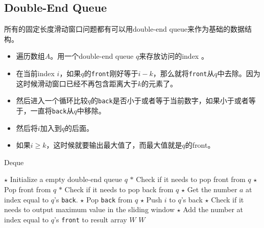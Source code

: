 \subsection{Double-End Queue}
\begin{CJK*}{UTF8}{gbsn}
所有的固定长度滑动窗口问题都有可以用double-end queue来作为基础的数据结构。
\begin{itemize}
\item 遍历数组$A$。用一个double-end queue $q$来存放访问的index
。
\item 在当前index $i$，如果$q$的\texttt{front}刚好等于$i-k$，那么就将\texttt{front}从$q$中去除。因为这时候滑动窗口已经不再包含距离大于$k$的元素了。
\item 然后进入一个循环比较$q$的\texttt{back}是否小于或者等于当前数字，如果小于或者等于，一直将\texttt{back}从$q$中移除。
\item 然后将$i$加入到$q$的后面。
\item 如果$i\geq k$，这时候就要输出最大值了，而最大值就是$q$的front。
\end{itemize}
\end{CJK*}
\setcounter{algorithm}{0}
\begin{algorithm}[H]
\caption{Deque}
\begin{algorithmic}[1]
\State $\star$ Initialize a empty double-end queue $q$
\State $\ast$ Check if it needs to pop front from $q$
\State $\star$ Pop front from $q$
\EndIf
\State $\ast$ Check if it needs to pop back from $q$
\State $\star$ Get the number $a$ at index equal to $q$'s
 \texttt{back}.
\State $\star$ Pop \texttt{back} from $q$
\EndIf
\EndWhile
\State $\star$ Push $i$ to $q$'s back
\State $\star$ Check if it needs to output maximum value in the sliding window
\State $\star$ Add the number at index equal to $q$'s \texttt{front} to result array $W$
\EndIf
\EndFor
\State \Return $W$
\EndProcedure
\end{algorithmic}
\end{algorithm}
\setcounter{lstlisting}{0}
